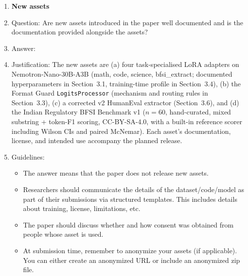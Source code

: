 \begin{enumerate}
\item {\bf New assets}
    \item[] Question: Are new assets introduced in the paper well documented and is the documentation provided alongside the assets?
    \item[] Answer: \answerYes{}
    \item[] Justification: The new assets are (a) four task-specialised LoRA adapters on Nemotron-Nano-30B-A3B (math, code, science, bfsi\_extract; documented hyperparameters in Section~3.1, training-time profile in Section~3.4), (b) the Format Guard \texttt{LogitsProcessor} (mechanism and routing rules in Section~3.3), (c) a corrected v2 HumanEval extractor (Section~3.6), and (d) the Indian Regulatory BFSI Benchmark v1 ($n{=}60$, hand-curated, mixed substring + token-F1 scoring, CC-BY-SA-4.0, with a built-in reference scorer including Wilson CIs and paired McNemar). Each asset's documentation, license, and intended use accompany the planned release.
    \item[] Guidelines:
    \begin{itemize}
        \item The answer \answerNA{} means that the paper does not release new assets.
        \item Researchers should communicate the details of the dataset\slash code\slash model as part of their submissions via structured templates. This includes details about training, license, limitations, etc. 
        \item The paper should discuss whether and how consent was obtained from people whose asset is used.
        \item At submission time, remember to anonymize your assets (if applicable). You can either create an anonymized URL or include an anonymized zip file.
    \end{itemize}


\end{enumerate}
